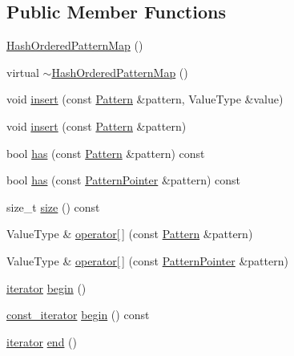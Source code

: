 \subsection*{Public Member Functions}
\begin{DoxyCompactItemize}
\item 
\hyperlink{classHashOrderedPatternMap_a8a1cb7250cb05276f9600af5283b376d}{Hash\+Ordered\+Pattern\+Map} ()
\item 
virtual \hyperlink{classHashOrderedPatternMap_a85d05fb0c6dcc95e7117c662967ccfdc}{$\sim$\+Hash\+Ordered\+Pattern\+Map} ()
\item 
void \hyperlink{classHashOrderedPatternMap_aec9cfa54723fbe49e75a4e93109ed0bf}{insert} (const \hyperlink{classPattern}{Pattern} \&pattern, Value\+Type \&value)
\item 
void \hyperlink{classHashOrderedPatternMap_a177fda1eb621d00266632cbf26025e8b}{insert} (const \hyperlink{classPattern}{Pattern} \&pattern)
\item 
bool \hyperlink{classHashOrderedPatternMap_a8682c2810f85d0c80ed015e388b571ef}{has} (const \hyperlink{classPattern}{Pattern} \&pattern) const 
\item 
bool \hyperlink{classHashOrderedPatternMap_ae2b83d2bcc1378b817044c205bd60651}{has} (const \hyperlink{classPatternPointer}{Pattern\+Pointer} \&pattern) const 
\item 
size\+\_\+t \hyperlink{classHashOrderedPatternMap_a5a48798964b7d667950f41630d3bf708}{size} () const 
\item 
Value\+Type \& \hyperlink{classHashOrderedPatternMap_ac37c92e91eb149eaa271054156264328}{operator\mbox{[}$\,$\mbox{]}} (const \hyperlink{classPattern}{Pattern} \&pattern)
\item 
Value\+Type \& \hyperlink{classHashOrderedPatternMap_a65a2aa5b240f6d88b205273331f212b9}{operator\mbox{[}$\,$\mbox{]}} (const \hyperlink{classPatternPointer}{Pattern\+Pointer} \&pattern)
\item 
\hyperlink{classHashOrderedPatternMap_a149481ae49379713dae0ffcaff294f65}{iterator} \hyperlink{classHashOrderedPatternMap_ac103913725b7036ba414453b2204b955}{begin} ()
\item 
\hyperlink{classHashOrderedPatternMap_a0162fc35654440e11ea66e71e8ffe8f8}{const\+\_\+iterator} \hyperlink{classHashOrderedPatternMap_a8bf9b181f9e7ed899ba48918af7a255d}{begin} () const 
\item 
\hyperlink{classHashOrderedPatternMap_a149481ae49379713dae0ffcaff294f65}{iterator} \hyperlink{classHashOrderedPatternMap_aa2a8090eed690299d4abeb36ea16fb3d}{end} ()

\end{DoxyCompactItemize}
